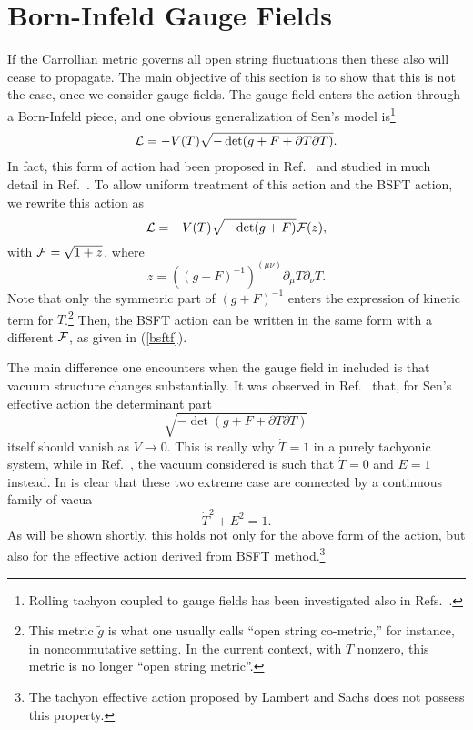 \documentclass[a4paper,12pt]{article}
\newcommand{\p}{\partial}
\begin{document}
\section{Born-Infeld Gauge Fields}

If the Carrollian metric governs all open string fluctuations then 
these also will cease to propagate. The main objective of this section
is to show that this is not the case, once we consider gauge fields.
The gauge field enters the action through a Born-Infeld piece, and one 
obvious generalization of Sen's model is\footnote{Rolling tachyon
coupled to gauge fields has been investigated also in Refs.\
\cite{Ishida, Muk}. } 
\begin{eqnarray}
{\cal L}=  - V(T) \sqrt{-  \det (g + F +\p T\p T)}.
 \label{tbi}
\end{eqnarray}
In fact, this form of action had been proposed in Ref.\ 
\cite{bergshoeff} and
studied in much detail in Ref.\ \cite{fluid}. To allow uniform treatment
of this action and the BSFT action, we rewrite this action as
\begin{equation}
{\cal L} =  - V(T) \sqrt{-  \det (g + F) } {\cal F}(z), \label{gauge}
\end{equation} 
with ${\cal F}=\sqrt{1+z}$, where 
\begin{equation} z=\left((g+F)^{-1}\right)^{(\mu \nu)}
\partial _\mu T\partial _\nu  T .
\end{equation}
Note that only the symmetric part of $(g+F)^{-1}$ enters the 
expression of kinetic term for $T$.\footnote{ 
This metric $\widetilde g$ is what one usually
calls ``open string co-metric,'' for instance, in noncommutative
setting. In the current context, with $\dot T$ nonzero, this metric is 
no longer ``open string metric''.}  Then, the BSFT action can be
written in the same form with a different ${\cal F}$, as given in
(\ref{bsftf}).


The main difference one encounters when the gauge field in included
is that vacuum structure changes substantially. It was observed in 
Ref.~\cite{fluid} that, for Sen's effective action
the determinant part 
\begin{equation}
\sqrt{-  \det (g + F +\p T\p T)} %
\end{equation}
itself should vanish as $V\rightarrow 0$. This is really why 
$\dot T = 1$ in a purely tachyonic system, while in Ref.~\cite{fluid}, 
the vacuum considered is such that $\dot T=0$ and $E=1$ instead.
In is clear that these two extreme case are connected by a continuous 
family of vacua
\begin{equation}
\dot T^2+E^2 = 1. \label{1}
\end{equation}
As will be shown shortly, this holds not only for the above
form of the action, but also for the effective action derived from BSFT
method.\footnote{The tachyon effective action proposed by 
Lambert and Sachs \cite{LS} does not possess this property. } 
\end{document}
